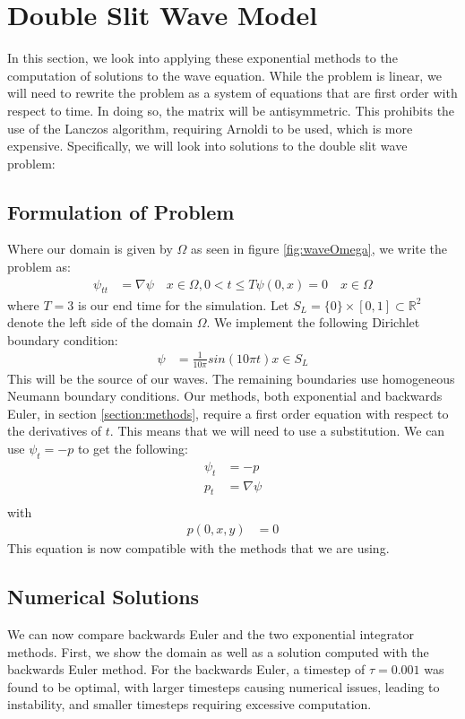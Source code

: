 \section{Double Slit Wave Model}

In this section, we look into applying these exponential methods to the computation of solutions to the wave equation.
While the problem is linear, we will need to rewrite the problem as a system of equations that are first order with respect to time.
In doing so, the matrix will be antisymmetric.
This prohibits the use of the Lanczos algorithm, requiring Arnoldi to be used, which is more expensive.
Specifically, we will look into solutions to the double slit wave problem:

\subsection{Formulation of Problem}
Where our domain is given by $\Omega$ as seen in figure \ref{fig:waveOmega}, we write the problem as:
\begin{align*}
    \psi_{tt} &= \nabla \psi \quad x \in \Omega, 0<t\leq T
    \psi(0,x) = 0 \quad x \in \Omega
\end{align*}
where $T=3$ is our end time for the simulation.
Let $S_L = \{0\} \times [0,1] \subset \mathbb{R}^2$ denote the left side of the domain $\Omega$.
We implement the following Dirichlet boundary condition:
\begin{align*}
    \psi &= \frac{1}{10\pi} sin(10\pi t) x \in S_L
\end{align*}
This will be the source of our waves.
The remaining boundaries use homogeneous Neumann boundary conditions.
Our methods, both exponential and backwards Euler, in section \ref{section:methods}, require a first order equation with respect to the derivatives of $t$.
This means that we will need to use a substitution.
We can use $\psi_t = -p$ to get the following:
\begin{align*}
    \psi_t &= -p\\
    p_t &= \nabla \psi\\
\end{align*}
with
\begin{align*}
    p(0,x,y) &= 0
\end{align*}
This equation is now compatible with the methods that we are using.

\subsection{Numerical Solutions}
We can now compare backwards Euler and the two exponential integrator methods.
First, we show the domain as well as a solution computed with the backwards Euler method.
For the backwards Euler, a timestep of $\tau = 0.001$ was found to be optimal, with larger timesteps causing numerical issues, leading to instability, and smaller timesteps requiring excessive computation.

